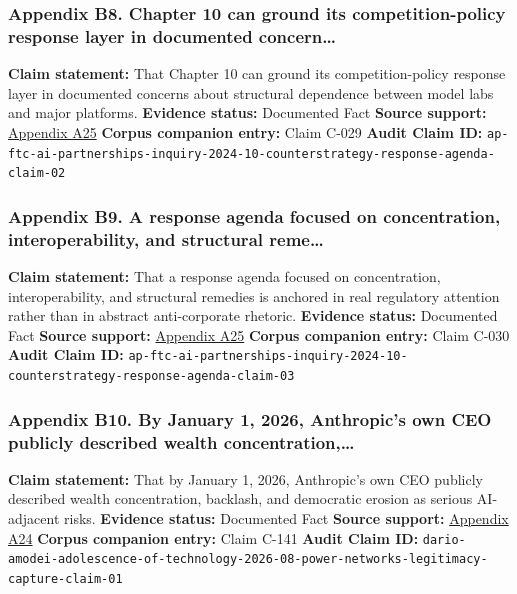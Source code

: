 \documentclass[
  american,
  11pt,
  letterpaper,
]{article}
\begin{document}
\subsubsection{Appendix B8. Chapter 10 can ground its competition-policy
response layer in documented
concern\ldots{}}\label{appendix-b8-chapter-10-can-ground-its-competition-policy-response-layer-in-documented-concern}

\textbf{Claim statement:} That Chapter 10 can ground its
competition-policy response layer in documented concerns about
structural dependence between model labs and major platforms.
\textbf{Evidence status:} Documented Fact \textbf{Source support:}
\hyperref[appendix-a25-ftc-opens-inquiry-into-big-tech-s-partnerships-with-leading-ai-startups]{Appendix
A25} \textbf{Corpus companion entry:} Claim C-029 \textbf{Audit Claim
ID:}
\texttt{ap-ftc-ai-partnerships-inquiry-2024-10-counterstrategy-response-agenda-claim-02}

\subsubsection{Appendix B9. A response agenda focused on concentration,
interoperability, and structural
reme\ldots{}}\label{appendix-b9-a-response-agenda-focused-on-concentration-interoperability-and-structural-reme}

\textbf{Claim statement:} That a response agenda focused on
concentration, interoperability, and structural remedies is anchored in
real regulatory attention rather than in abstract anti-corporate
rhetoric. \textbf{Evidence status:} Documented Fact \textbf{Source
support:}
\hyperref[appendix-a25-ftc-opens-inquiry-into-big-tech-s-partnerships-with-leading-ai-startups]{Appendix
A25} \textbf{Corpus companion entry:} Claim C-030 \textbf{Audit Claim
ID:}
\texttt{ap-ftc-ai-partnerships-inquiry-2024-10-counterstrategy-response-agenda-claim-03}

\subsubsection{Appendix B10. By January 1, 2026, Anthropic's own CEO
publicly described wealth
concentration,\ldots{}}\label{appendix-b10-by-january-1-2026-anthropic-s-own-ceo-publicly-described-wealth-concentration}

\textbf{Claim statement:} That by January 1, 2026, Anthropic's own CEO
publicly described wealth concentration, backlash, and democratic
erosion as serious AI-adjacent risks. \textbf{Evidence status:}
Documented Fact \textbf{Source support:}
\hyperref[appendix-a24-the-adolescence-of-technology]{Appendix A24}
\textbf{Corpus companion entry:} Claim C-141 \textbf{Audit Claim ID:}
\texttt{dario-amodei-adolescence-of-technology-2026-08-power-networks-legitimacy-capture-claim-01}
\end{document}
